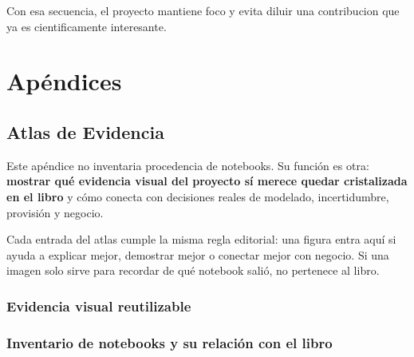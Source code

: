 \documentclass[
  spanish,
  11pt,
  letterpaper,
]{scrbook}
\theoremstyle{plain}
\theoremstyle{remark}
\begin{document}
Con esa secuencia, el proyecto mantiene foco y evita diluir una
contribucion que ya es cientificamente interesante.

\part{Apéndices}

\chapter{Atlas de Evidencia}\label{atlas-de-evidencia}

Este apéndice no inventaria procedencia de notebooks. Su función es
otra: \textbf{mostrar qué evidencia visual del proyecto sí merece quedar
cristalizada en el libro} y cómo conecta con decisiones reales de
modelado, incertidumbre, provisión y negocio.

Cada entrada del atlas cumple la misma regla editorial: una figura entra
aquí si ayuda a explicar mejor, demostrar mejor o conectar mejor con
negocio. Si una imagen solo sirve para recordar de qué notebook salió,
no pertenece al libro.

\section{Evidencia visual
reutilizable}\label{evidencia-visual-reutilizable}

\section{Inventario de notebooks y su relación con el
libro}\label{inventario-de-notebooks-y-su-relaciuxf3n-con-el-libro}
\end{document}
